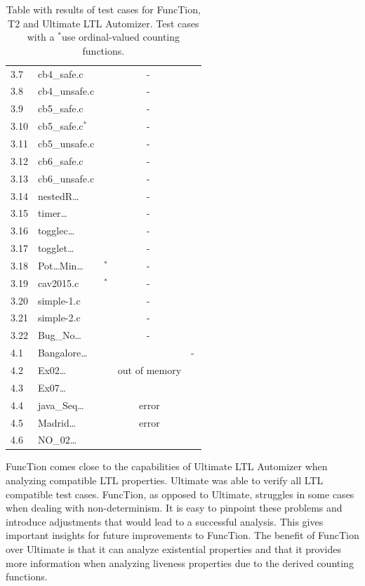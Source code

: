\documentclass[11pt,a4paper,titlepage]{article}
\theoremstyle{definition}
\newcommand{\cmark}{\textcolor{green!75!black}{\ding{51}$^{\ }$}} %
\newcommand{\nmark}{-$^{\ }$} %
\newcommand{\smark}{\textcolor{green!75!black}{\ding{51}$^*$}} %
\newcommand{\xmark}{\textcolor{red}{\ding{55}$^{\ }$}} %
\begin{document}
\begin{table}
\begin{center}
\begin{tabular}{llccc}
3.7 & cb4\_safe.c & \cmark & \nmark & \cmark \\
3.8 & cb4\_unsafe.c & \cmark & \nmark & \cmark \\
3.9 & cb5\_safe.c & \xmark & \nmark & \cmark \\
3.10 & cb5\_safe.c$^*$ & \cmark & \nmark & \cmark \\
3.11 & cb5\_unsafe.c & \cmark & \nmark & \cmark \\
3.12 & cb6\_safe.c & \cmark & \nmark & \cmark \\
3.13 & cb6\_unsafe.c & \cmark & \nmark & \cmark \\
3.14 & nestedR\dots & \cmark & \nmark & \cmark \\
3.15 & timer\dots & \xmark & \nmark & \cmark \\
3.16 & togglec\dots & \xmark & \nmark & \cmark \\
3.17 & togglet\dots & \cmark & \nmark & \cmark \\
3.18 & Pot\dots Min\dots & \smark & \nmark & \cmark \\
3.19 & cav2015.c & \smark & \nmark & \cmark \\
3.20 & simple-1.c & \cmark & \nmark & \cmark \\
3.21 & simple-2.c & \cmark & \nmark & \cmark \\
3.22 & Bug\_No\dots & \cmark & \nmark & \cmark \\
\hline
4.1 & Bangalore\dots & \xmark & \cmark & \nmark \\
4.2 & Ex02\dots & \cmark & out of memory & \cmark \\
4.3 & Ex07\dots & \cmark & \xmark & \cmark \\
4.4 & java\_Seq\dots & \cmark & error & \cmark \\
4.5 & Madrid\dots & \cmark & error & \cmark \\
4.6 & NO\_02\dots & \cmark & \cmark & \cmark \\
\end{tabular}
\end{center}    
\caption{Table with results of test cases for FuncTion, T2 and Ultimate LTL Automizer. 
    Test cases with a \smark use ordinal-valued counting functions. }
\label{tbl:test_cases_results}
\end{table}


FuncTion comes close to the capabilities of Ultimate LTL Automizer when analyzing compatible LTL properties. 
Ultimate was able to verify all LTL compatible test cases. 
FuncTion, as opposed to Ultimate, struggles in some cases when dealing with non-determinism.  
It is easy to pinpoint these problems and introduce adjustments that
would lead to a successful analysis. This gives important insights for future improvements to FuncTion. 
The benefit of FuncTion over Ultimate is that it can analyze existential properties and that 
it provides more information when analyzing liveness properties due to the derived counting functions.\\
\end{document}
